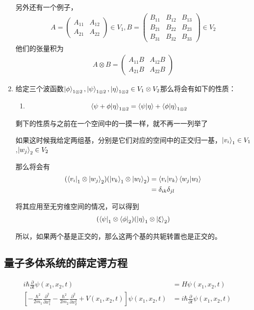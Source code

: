 \documentclass{article}
\newcommand{\pmtwo}[4]{\begin{pmatrix}#1&#2\\#3&#4\end{pmatrix}}
\newcommand{\pmthree}[9]{
    \begin{pmatrix}
        #1&#2&#3\\
        #4&#5&#6\\
        #7&#8&#9
    \end{pmatrix}
}
\begin{document}
\begin{enumerate}
\begin{align*}
    \end{align*}
    另外还有一个例子，
    \begin{align*}
        A=\pmtwo{A_{11}}{A_{12}}{A_{21}}{A_{22}}\in V_1,
        B=\pmthree{B_{11}}{B_{12}}{B_{13}}{B_{21}}{B_{22}}{B_{23}}{B_{31}}{B_{32}}{B_{33}}\in V_2
    \end{align*}
    他们的张量积为
    \begin{align*}
        A\otimes B=
        \begin{pmatrix}
            A_{11}B&A_{12}B\\
            A_{21}B&A_{22}B
        \end{pmatrix}
    \end{align*}
    \item 给定三个波函数$\displaystyle\ket{\phi}_{1\otimes 2},\ket{\psi}_{1\otimes 2},\ket{\eta}_{1\otimes 2}\in V_1\otimes V_2$那么将会有如下的性质：
    \begin{enumerate}
        \item \[\braket{\psi+\phi}{\eta}_{1\otimes2}=\braket{\psi}{\eta}+\braket{\phi}{\eta}_{1\otimes2}\]
    \end{enumerate}
    剩下的性质与之前在一个空间中的一摸一样，就不再一一列举了

    如果这时候我给定两组基，分别是它们对应的空间中的正交归一基，$\ket{v_i}_1\in V_1$,$\ket{w_j}_2 \in V_2$

    那么将会有
    \begin{align*}
        (\bra{v_i}_1\otimes\ket{w_j}_2)(\ket{v_k}_1\otimes\ket{w_l}_2)&=\braket{v_i}{v_k}\braket{w_j}{w_l}\\
        &=\delta_{ik}\delta_{jl}
    \end{align*}

    将其应用至无穷维空间的情况，可以得到
    \begin{align*}
        (\bra{\psi}_1\otimes \bra{\phi}_2)(\ket{\eta}_1\otimes \ket{\xi}_2)
    \end{align*}

    所以，如果两个基是正交的，那么这两个基的共轭转置也是正交的。
\end{enumerate}


\subsection{量子多体系统的薛定谔方程}
\begin{align*}
    i\hbar\frac{\partial}{\partial t}\psi(x_1,x_2,t) &= H\psi(x_1,x_2,t)\\
    \left[-\frac{\hbar^2}{2m_1}\frac{\partial^2}{\partial x_1^2}-\frac{\hbar^2}{2m_2}\frac{\partial^2}{\partial x_2^2}+V(x_1,x_2,t)\right]\psi(x_1,x_2,t) &= i\hbar\frac{\partial}{\partial t}\psi(x_1,x_2,t)
\end{align*}
\end{document}
